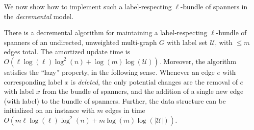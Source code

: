 \documentclass{article}
\begin{document}
We now show how to implement such a label-respecting $\ell$-bundle of spanners in the \emph{decremental} model.

\begin{claim}\label{clm:decrementalLabelledSpanning}
    There is a decremental algorithm for maintaining a label-respecting $\ell$-bundle of spanners of an undirected, unweighted multi-graph $G$ with label set $\mathcal{U}$, with $\leq m$ edges total. The amortized update time is $O(\ell
    \log(\ell) \log^2(n) + \log(m) \log(\mathcal{U}))$. Moreover, the algorithm satisfies the ``lazy'' property, in the following sense. Whenever an edge $e$ with corresponding label $x$ is \emph{deleted}, the only potential changes are the removal of $e$ with label $x$ from the bundle of spanners, and the addition of a single new edge (with label) to the bundle of spanners. Further, the data structure can be initialized on an instance with $m$ edges in time $O(m \ell \log(\ell) \log^2(n) + m \log(m) \log(|\mathcal{U}|))$.
\end{claim}
\end{document}
